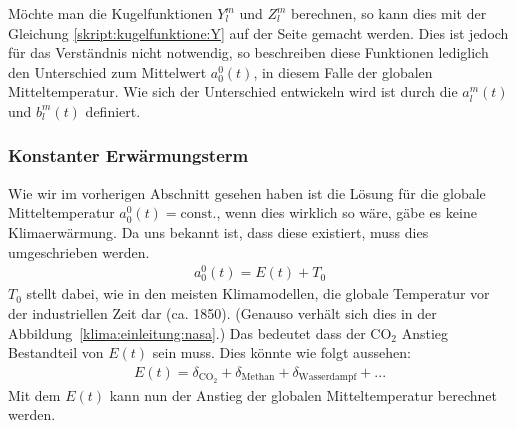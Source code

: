 \begin{refsection}
Möchte man die Kugelfunktionen $Y^m_l$ und $Z^m_l$ berechnen, so kann dies mit der Gleichung \eqref{skript:kugelfunktione:Y} auf der Seite \pageref{skript:kugelfunktione:Y} gemacht werden. Dies ist jedoch für das Verständnis nicht notwendig, so beschreiben diese Funktionen lediglich den Unterschied zum Mittelwert $a^0_0(t)$, in diesem Falle der globalen Mitteltemperatur. Wie sich der Unterschied entwickeln wird ist durch die $a^m_l(t)$ und $b^m_l(t)$ definiert.


\subsubsection{Konstanter Erwärmungsterm
\label{klima:subsubsection:erwaermungsterm}}
Wie wir im vorherigen Abschnitt gesehen haben ist die Lösung für die globale Mitteltemperatur $a^0_0(t)=\text{const.}$, wenn dies wirklich so wäre, gäbe es keine Klimaerwärmung. Da uns bekannt ist, dass diese existiert, muss dies umgeschrieben werden.
\begin{align}
a^0_0(t)=E(t)+ T_0
\end{align}
$T_0$ stellt dabei, wie in den meisten Klimamodellen, die globale Temperatur vor der industriellen Zeit dar (ca. 1850). (Genauso verhält sich dies in der Abbildung~\ref{klima:einleitung:nasa}.) Das bedeutet dass der CO$_2$ Anstieg Bestandteil von $E(t)$ sein muss. Dies könnte wie folgt aussehen:
\begin{align}
E(t)=\delta_{\text{CO}_2}+\delta_{\text{Methan}}+\delta_{\text{Wasserdampf}}+...
\end{align}
Mit dem $E(t)$ kann nun der Anstieg der globalen Mitteltemperatur berechnet werden.



\end{refsection}
